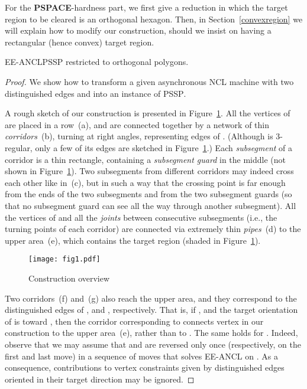 \documentclass{style}
\newcommand{\complexityclass}[1]{\textbf{#1}}
\newcommand{\computproblem}[1]{\textsc{#1}}
\newcommand{\PSPACE}{\complexityclass{PSPACE}\xspace}
\newcommand{\EEANCL}{\computproblem{EE-ANCL}\xspace}
\newcommand{\PSSP}{\computproblem{PSSP}\xspace}
\begin{document}
For the \PSPACE-hardness part, we first give a reduction in which the target region to be cleared is an orthogonal hexagon. Then, in Section~\ref{convexregion} we will explain how to modify our construction, should we insist on having a rectangular (hence convex) target region.

\begin{lemma} \label{lemma2}
\EEANCL  \PSSP restricted to orthogonal polygons.
\end{lemma}
\begin{proof}
We show how to transform a given asynchronous NCL machine  with two distinguished edges  and  into an instance of \PSSP.

A rough sketch of our construction is presented in Figure~\ref{fig1}. All the vertices of  are placed in a row~(a), and are connected together by a network of thin \emph{corridors}~(b), turning at right angles, representing edges of . (Although  is 3-regular, only a few of its edges are sketched in Figure~\ref{fig1}.)
Each \emph{subsegment} of a corridor is a thin rectangle, containing a \emph{subsegment guard} in the middle (not shown in Figure~\ref{fig1}). Two subsegments from different corridors may indeed cross each other like in~(c), but in such a way that the crossing point is far enough from the ends of the two subsegments and from the two subsegment guards (so that no subsegment guard can see all the way through another subsegment). All the vertices of  and all the \emph{joints} between consecutive subsegments (i.e., the turning points of each corridor) are connected via extremely thin \emph{pipes}~(d) to the upper area~(e), which contains the target region (shaded in Figure~\ref{fig1}).

\begin{figure}[ht]
\centering
\texttt{[image: fig1.pdf]}
\caption{Construction overview}
\label{fig1}
\end{figure}

Two corridors~(f) and~(g) also reach the upper area, and they correspond to the distinguished edges of ,  and , respectively. That is, if , and the target orientation of  is toward , then the corridor corresponding to  connects vertex  in our construction to the upper area~(e), rather than to . The same holds for . Indeed, observe that we may assume that  and  are reversed only once (respectively, on the first and last move) in a sequence of moves that solves \EEANCL on . As a consequence, contributions to vertex constraints given by distinguished edges oriented in their target direction may be ignored.


\end{proof}
\end{document}
